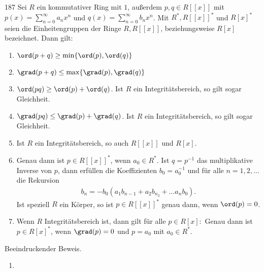 \begin{algebraUE}{187}
Sei $R$ ein kommutativer Ring mit $1$, außerdem $p,q \in R[[x]]$ mit
$p(x) = \sum_{n=0}^{\infty}a_nx^n$ und $q(x) = \sum_{n=0}^{\infty}b_nx^n$.
Mit $R^*,R[[x]]^*$ und $R[x]^*$ seien die Einheitengruppen der Ringe
$R, R[[x]]$, beziehungsweise $R[x]$ bezeichnet. Dann gilt:
\begin{enumerate}
  \item $\ord(p + q) \geq \min\{\ord(p),\ord(q)\}$
  \item $\grad(p + q) \leq \max\{\grad(p),\grad(q)\}$
  \item $\ord(pq) \geq \ord(p) + \ord(q)$. Ist $R$ ein Integritätsbereich, so gilt
  sogar Gleichheit.
  \item $\grad(pq) \leq \grad(p) + \grad(q)$. Ist $R$ ein Integritätsbereich, so gilt
  sogar Gleichheit.
  \item Ist $R$ ein Integritätsbereich, so auch $R[[x]]$ und $R[x]$.
  \item Genau dann ist $p \in R[[x]]^*$, wenn $a_0 \in R^*$. Ist $q = p^{-1}$
  das multiplikative Inverse von $p$, dann erfüllen die Koeffizienten $b_0 = a_0^{-1}$
  und für alle $n = 1,2,\dots$ die Rekursion
  \begin{align*}
    b_n = -b_0(a_1b_{n-1} + a_2b_{n_2} + \dots a_nb_0).
  \end{align*}
  Ist speziell $R$ ein Körper, so ist $p \in R[[x]]^*$ genau dann, wenn $\ord(p) = 0$.
  \item Wenn $R$ Integritätsbereich ist, dann gilt für alle $p \in R[x]:$ Genau dann
  ist $p \in R[x]^*$, wenn $\grad(p) = 0$ und $p = a_0$ mit $a_0 \in R^*$.
\end{enumerate}
\end{algebraUE}
\begin{solution}
Beeindruckender Beweis.
\begin{enumerate}
  \item
\end{enumerate}
\end{solution}
